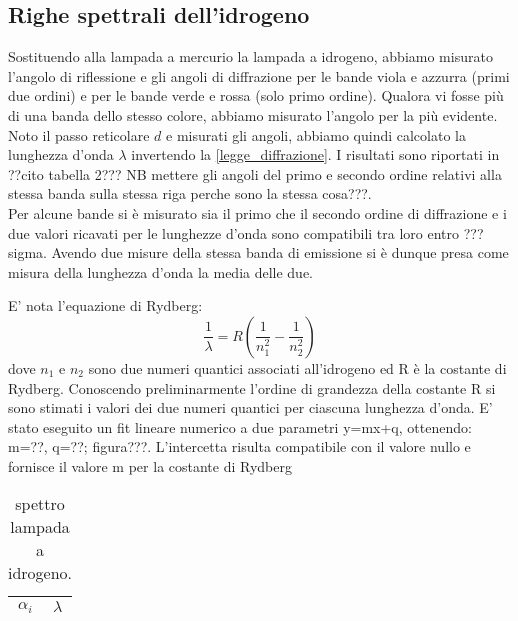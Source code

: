 \subsection{Righe spettrali dell'idrogeno}

Sostituendo alla lampada a mercurio la lampada a idrogeno, abbiamo misurato l'angolo di riflessione e gli angoli di diffrazione per le bande viola e azzurra (primi due ordini) e per le bande verde e rossa (solo primo ordine). Qualora vi fosse più di una banda dello stesso colore, abbiamo misurato l'angolo per la più evidente. Noto il passo reticolare $d$ e misurati gli angoli, abbiamo quindi calcolato la lunghezza d'onda $\lambda$ invertendo la \ref{legge_diffrazione}. I risultati sono riportati in ??cito tabella 2??? NB mettere gli angoli del primo e secondo ordine relativi alla stessa banda sulla stessa riga perche sono la stessa cosa???.\\
Per alcune bande si è misurato sia il primo che il secondo ordine di diffrazione e i due valori ricavati per le lunghezze d'onda sono compatibili tra loro entro ???sigma. Avendo due misure della stessa banda di emissione si è dunque presa come misura della lunghezza d'onda la media delle due.

E' nota l'equazione di Rydberg:
\begin{equation}
\frac{1}{\lambda} = R (\frac{1}{n_{1}^2} - \frac{1}{n_{2}^2})
\end{equation} dove $n_1$ e $n_2$  sono due numeri quantici associati all'idrogeno ed R è la costante di Rydberg. Conoscendo preliminarmente l'ordine di grandezza della costante R si sono stimati i valori dei due numeri quantici per ciascuna lunghezza d'onda. E' stato eseguito un fit lineare numerico a due parametri y=mx+q, ottenendo: m=??, q=??; figura???.
L'intercetta risulta compatibile con il valore nullo e fornisce il valore m per la costante di Rydberg

\begin{table}[h]
\begin{center}
\begin{tabular}{| r @{$\pm$} l  @{ Rad } | r @{$\pm$} l  @{\quad nm } |}

\hline
\multicolumn{2}{c|}{$\alpha_{i}$} & \multicolumn{2}{c|}{$\lambda$} \\
\hline

\hline
\end{tabular}
\caption{spettro lampada a idrogeno.}
\end{center}
\end{table}
